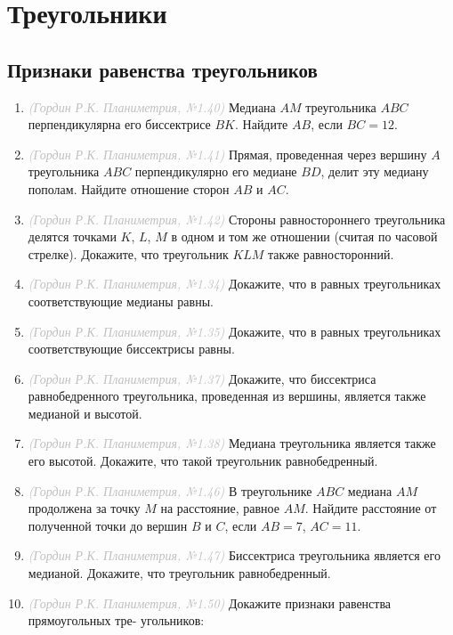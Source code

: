 \documentclass[10pt, a4paper]{article}
\newcommand{\source}[1]{\textcolor{silver}{\textit{(#1)}}}
\begin{document}
		

\section{Треугольники}
\subsection{Признаки равенства треугольников}
	\begin{enumerate}
		\item \source{Гордин Р.К. Планиметрия, №1.40} Медиана $AM$ треугольника $ABC$ перпендикулярна его биссектрисе $BK$. Найдите $AB$, если $BC = 12$.
		\item \source{Гордин Р.К. Планиметрия, №1.41} Прямая,  проведенная  через  вершину  $A$  треугольника $ABC$ перпендикулярно его медиане $BD$, 
		делит эту медиану пополам. Найдите отношение сторон $AB$ и $AC$.
		\item \source{Гордин Р.К. Планиметрия, №1.42} Стороны  равностороннего  треугольника  делятся  точками $K$, $L$, $M$ в одном и том же отношении (считая по часовой стрелке).  Докажите,  что  треугольник $KLM$  также  равносторонний.
		\item \source{Гордин Р.К. Планиметрия, №1.34} Докажите, что в равных треугольниках соответствующие медианы равны.
		\item \source{Гордин Р.К. Планиметрия, №1.35} Докажите, что в равных треугольниках соответствующие биссектрисы равны.
		\item \source{Гордин Р.К. Планиметрия, №1.37} Докажите, что биссектриса равнобедренного треугольника, проведенная из вершины, является также медианой
		и высотой.
		\item \source{Гордин Р.К. Планиметрия, №1.38} Медиана треугольника является также его высотой.
		Докажите, что такой треугольник равнобедренный.
		\item \source{Гордин Р.К. Планиметрия, №1.46} В треугольнике $ABC$ медиана $AM$ продолжена за точку $M$ на расстояние, равное $AM$. Найдите расстояние от полученной точки до вершин $B$ и $C$, если $AB = 7$, $AC = 11$.
		\item \source{Гордин Р.К. Планиметрия, №1.47} Биссектриса треугольника является его медианой. Докажите, что треугольник равнобедренный.
		\item \source{Гордин Р.К. Планиметрия, №1.50} Докажите признаки равенства прямоугольных тре-
		угольников:
		\begin{enumerate}[label=\asbuk*)]

\end{enumerate}
\end{enumerate}
\end{document}
